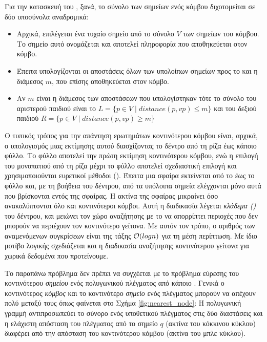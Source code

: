 Για την κατασκευή του , ξανά, το σύνολο των σημείων 
ενός κόμβου διχοτομείται σε δύο υποσύνολα αναδρομικά:
\begin{itemize}
    \item Αρχικά, επιλέγεται ένα τυχαίο σημείο από το σύνολο $V$ των σημείων 
    του κόμβου. Το σημείο αυτό ονομάζεται \textit{} 
    και αποτελεί πληροφορία που αποθηκεύεται στον κόμβο.
    \item Έπειτα υπολογίζονται οι αποστάσεις όλων των υπολοίπων σημείων 
    προς το  και η διάμεσος $m$, που επίσης αποθηκεύεται στον κόμβο.
    \item Αν $m$ είναι η διάμεσος των αποστάσεων που υπολογίστηκαν 
    τότε το σύνολο του αριστερού παιδιού είναι το 
    $L = \{p \in V \mid distance(p,vp) \leq m \}$
    και του δεξιού παιδιού 
    $R = \{p \in V \mid distance(p,vp) \geq m \}$
\end{itemize} 

Ο τυπικός τρόπος για την απάντηση ερωτημάτων κοντινότερου κόμβου 
είναι, αρχικά, ο υπολογισμός μιας εκτίμησης αυτού διασχίζοντας το δέντρο 
από τη ρίζα έως κάποιο φύλλο. 
Το φύλλο αποτελεί την πρώτη εκτίμηση κοντινότερου κόμβου, ενώ η επιλογή του 
μονοπατιού από τη ρίζα μέχρι το φύλλο αποτελεί σχεδιαστική επιλογή και 
χρησιμοποιούνται ευρετικοί μέθοδοι ().
Έπειτα μια σφαίρα εκτείνεται από το  έως το φύλλο 
και, με τη βοήθεια του δέντρου, από τα υπόλοιπα σημεία ελέγχονται μόνο 
αυτά που βρίσκονται εντός της σφαίρας. 
Η ακτίνα της σφαίρας μικραίνει όσο ανακαλύπτονται όλο και κοντινότεροι 
κόμβοι.
Αυτή η διαδικασία λέγεται \textit{κλάδεμα ()} του δέντρου,
και μειώνει τον χώρο αναζήτησης με το να απορρίπτει περιοχές που δεν 
μπορούν να περιέχουν τον κοντινότερο γείτονα. 
Με αυτόν τον τρόπο, ο αριθμός των αναμενόμενων συγκρίσεων 
είναι της τάξης $\mathcal{O}(logn)$ για τη μέση περίπτωση. 
Με ίδιο μοτίβο λογικής σχεδιάζεται και η διαδικασία αναζήτησης 
κοντινότερου γείτονα για χωρικά δεδομένα που προτείνουμε. 

Το παραπάνω πρόβλημα δεν πρέπει να συγχέεται με το πρόβλημα εύρεσης 
του κοντινότερου \textit{σημείου} ενός πολυγωνικού πλέγματος από 
κάποιο . Γενικά ο κοντινότερος \textit{κόμβος} και 
το κοντινότερο \textit{σημείο} ενός πλέγματος μπορούν να απέχουν 
πολύ μεταξύ τους όπως φαίνεται στο Σχήμα \ref{fig:nearest_node}:
Η πολυγωνική γραμμή αντιπροσωπεύει το σύνορο ενός υποθετικού πλέγματος 
στις δύο διαστάσεις και η ελάχιστη απόσταση του πλέγματος από το σημείο 
$q$ (ακτίνα του κόκκινου κύκλου) διαφέρει από την 
απόσταση του κοντινότερου κόμβου (ακτίνα του μπλε κύκλου).


